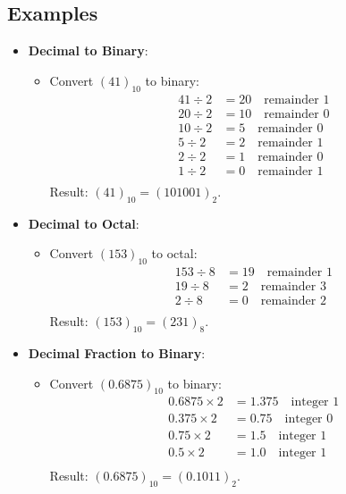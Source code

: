 \documentclass{article}
\begin{document}
	\subsection*{Examples}
	\begin{itemize}
		\item \textbf{Decimal to Binary}:
		\begin{itemize}
			\item Convert $(41)_{10}$ to binary:
			\begin{align*}
				41 \div 2 &= 20 \quad \text{remainder } 1 \\
				20 \div 2 &= 10 \quad \text{remainder } 0 \\
				10 \div 2 &= 5 \quad \text{remainder } 0 \\
				5 \div 2 &= 2 \quad \text{remainder } 1 \\
				2 \div 2 &= 1 \quad \text{remainder } 0 \\
				1 \div 2 &= 0 \quad \text{remainder } 1 \\
			\end{align*}
			Result: $(41)_{10} = (101001)_2$.
		\end{itemize}
		\item \textbf{Decimal to Octal}:
		\begin{itemize}
			\item Convert $(153)_{10}$ to octal:
			\begin{align*}
				153 \div 8 &= 19 \quad \text{remainder } 1 \\
				19 \div 8 &= 2 \quad \text{remainder } 3 \\
				2 \div 8 &= 0 \quad \text{remainder } 2 \\
			\end{align*}
			Result: $(153)_{10} = (231)_8$.
		\end{itemize}
		\item \textbf{Decimal Fraction to Binary}:
		\begin{itemize}
			\item Convert $(0.6875)_{10}$ to binary:
			\begin{align*}
				0.6875 \times 2 &= 1.375 \quad \text{integer } 1 \\
				0.375 \times 2 &= 0.75 \quad \text{integer } 0 \\
				0.75 \times 2 &= 1.5 \quad \text{integer } 1 \\
				0.5 \times 2 &= 1.0 \quad \text{integer } 1 \\
			\end{align*}
			Result: $(0.6875)_{10} = (0.1011)_2$.

\end{itemize}
\end{itemize}
\end{document}
